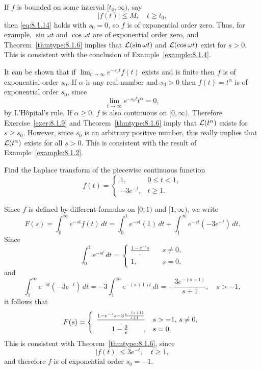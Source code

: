 \documentclass{ximera}
\begin{document}
\begin{example}\label{example:8.1.8}
If $f$ is bounded on some interval $[t_0,\infty)$, say
$$
|f(t)| \leq M,\quad t \geq t_0,
$$
then \eqref{eq:8.1.14} holds with $s_0=0$, so $f$ is of exponential order
zero. Thus, for example, $\sin\omega t$ and $\cos \omega t$ are of
exponential order zero, and Theorem~\ref{thmtype:8.1.6} implies that
${\cal L}(\sin\omega t)$ and ${\cal L}(\cos \omega t)$ exist for
$s>0$. This is consistent with the conclusion of
Example~\ref{example:8.1.4}.
\end{example}

\begin{example}\label{example:8.1.9}
It can be shown that if $\lim_{t\rightarrow\infty}e^{-s_0t}f(t)$ exists and is
finite then $f$ is of exponential order $s_0$.
If $\alpha$ is any real number and $s_0>0$
then $f(t)=t^\alpha$ is of exponential order $s_0$, since
$$
\lim_{t\rightarrow\infty}e^{-s_0t}t^\alpha=0,
$$
by L'H\^opital's rule. If $\alpha\geq 0$, $f$ is also
continuous on $[0,\infty)$. Therefore Exercise~\ref{exer:8.1.9} and
Theorem~\ref{thmtype:8.1.6} imply that ${\cal L}(t^\alpha)$ exists for
$s\geq s_0$. However, since $s_0$ is an arbitrary positive number, this
really implies that ${\cal L}(t^\alpha)$ exists for all $s>0$. This is
consistent with the result of Example~\ref{example:8.1.2}.
\end{example}

\begin{example}\label{example:8.1.10}
Find the Laplace transform of the piecewise continuous function
$$
f(t)=\left\{\begin{array}{cl} 1,&0\leq t<1,\\  -3e^{-t},&t\geq
1.\end{array}\right.
$$
\begin{explanation}
Since $f$ is defined by different formulas
on $[0,1)$ and $[1,\infty)$, we write
$$
 F(s)=\int_0^\infty e^{-st} f(t)\,dt
=\int_0^1e^{-st}(1)\,dt+\int_1^\infty
e^{-st}(-3e^{-t})\,dt.
$$
Since
$$
\int_0^1e^{-st}\,dt=\left\{\begin{array}{cl}\frac{{1-e^{-s}}{s}},&\quad s\neq 0,\\ 1,&\quad s=0,\end{array}\right.
$$
 and
$$
\int_1^\infty e^{-st}(-3e^{-t})\,dt=-3\int_1^\infty
e^{-(s+1)t}\,dt=-\frac{3e^{-(s+1)}}{s+1},\quad s>-1,
$$
it follows that
$$
F(s)=\left\{\begin{array}{rl}\frac{{1-e^{-s}}{s}-3\frac{e^{-(s+1)}}{s+1}},&s>-1,\,s\neq 0,\\\hfill{1-\frac{3}{e}}\hfill,&
s=0.\end{array}\right.
$$
This is consistent with Theorem~\ref{thmtype:8.1.6}, since
$$
|f(t)|\leq 3e^{-t},\quad  t\geq 1,
$$
and therefore $f$ is of exponential order $s_0=-1$.
\end{explanation}
\end{example}
\end{document}
